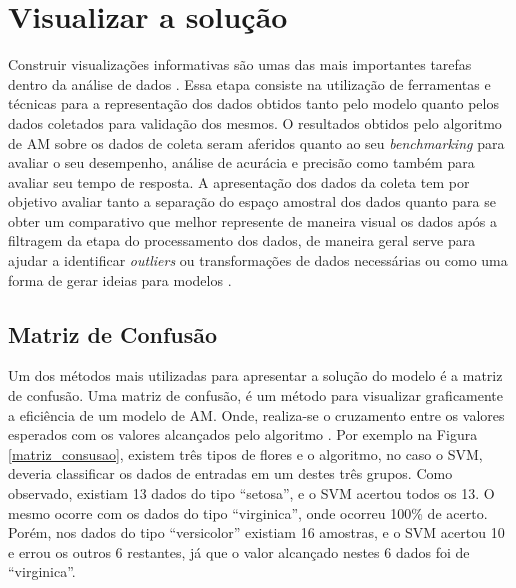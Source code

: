 \section{Visualizar a solução}
Construir visualizações informativas são umas das mais importantes tarefas dentro da análise de dados \cite{McKinney2012datapython}. Essa etapa consiste na utilização de ferramentas e técnicas para a representação dos dados obtidos tanto pelo modelo quanto pelos dados coletados para validação dos mesmos. O resultados obtidos pelo algoritmo de AM sobre os dados de coleta seram aferidos quanto ao seu \textit{benchmarking} \cite{Benchmarking} para avaliar o seu desempenho, análise de acurácia e precisão como também para avaliar seu tempo de resposta. A apresentação dos dados da coleta tem por objetivo avaliar tanto a separação do espaço amostral dos dados quanto para se obter um comparativo que melhor represente de maneira visual os dados após a filtragem da etapa do processamento dos dados, de maneira geral serve para ajudar a identificar \textit{outliers} ou transformações de dados necessárias ou como uma forma de gerar ideias para modelos \cite{McKinney2012datapython}.

\subsection{Matriz de Confusão}
\label{sc:matrizconsusao}
Um dos métodos mais utilizadas para apresentar a solução do modelo é a matriz de confusão. Uma matriz de confusão, é um método para visualizar graficamente a eficiência de um modelo de AM. Onde, realiza-se o cruzamento entre os valores esperados com os valores alcançados pelo algoritmo \cite{caelen2017bayesian}. Por exemplo na Figura \ref{matriz_consusao}, existem três tipos de flores e o algoritmo, no caso o SVM, deveria classificar os dados de entradas em um destes três grupos. Como observado, existiam 13 dados do tipo “setosa”, e o SVM acertou todos os 13. O mesmo ocorre com os dados do tipo “virginica”, onde ocorreu 100\% de acerto. Porém, nos dados do tipo “versicolor” existiam 16 amostras, e o SVM acertou 10 e errou os outros 6 restantes, já que o valor alcançado nestes 6 dados foi de “virginica”.

